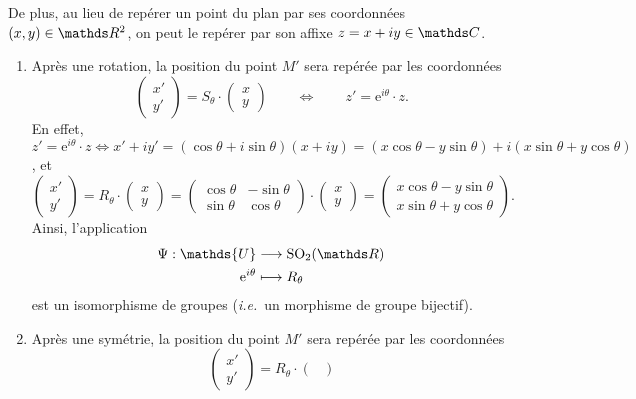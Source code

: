\begin{rmk}
	De plus, au lieu de repérer un point du plan par ses coordonnées $(x,y) \in \R^2$, on peut le repérer par son affixe $z = x + iy \in \C$.
	\begin{enumerate}[label=(\alph*)]
		\item Après une rotation, la position du point $M'$\/ sera repérée par les coordonnées \[
					\begin{pmatrix}
						x'\\
						y'
					\end{pmatrix} = S_\theta \cdot \begin{pmatrix}
						x\\ y
					\end{pmatrix} \quad\quad \iff \quad\quad z' = \mathrm{e}^{i\theta} \cdot z
			.\] En effet, $z' = \mathrm{e}^{i\theta} \cdot z \iff x' + iy' = (\cos \theta + i \sin \theta)(x+iy) = (x \cos \theta - y \sin \theta) + i (x\sin \theta + y \cos \theta)$, et \[
				\begin{pmatrix}
					x'\\y'
				\end{pmatrix} = R_\theta \cdot \begin{pmatrix}
					x\\ y
				\end{pmatrix} = \begin{pmatrix}
					\cos \theta & -\sin \theta\\
					\sin \theta & \cos \theta
				\end{pmatrix} \cdot \begin{pmatrix}
					x\\y
				\end{pmatrix} = \begin{pmatrix}
					x \cos \theta - y \sin \theta\\
					x \sin \theta + y \cos \theta
				\end{pmatrix}
			.\]
			Ainsi, l'application \begin{align*}
				\Psi: \mathds{U} &\longrightarrow \mathrm{SO}_2(\R) \\
				\mathrm{e}^{i\theta} &\longmapsto R_\theta
			\end{align*} est un isomorphisme de groupes (\textit{i.e.}\ un morphisme de groupe bijectif).
		\item Après une symétrie, la position du point $M'$\/ sera repérée par les coordonnées \[
					\begin{pmatrix}
						x'\\
						y'
					\end{pmatrix} = R_\theta \cdot \begin{pmatrix}

\end{pmatrix}\]
\end{enumerate}
\end{rmk}
